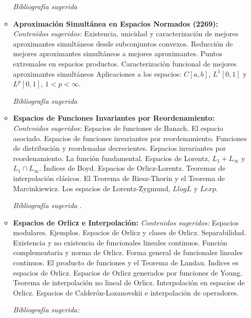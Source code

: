 \documentclass[a4paper, 12pt]{article}
\begin{document}
\begin{enumerate}
\begin{itemize}
\noindent \textit{Bibliografía sugerida}
\cite{cheney66,lorentz2005approximation,pinkus1989l1,iske2018approximation,powell1981approximation,rice1964approximation,singer1970best}



\item\textbf{ Aproximación Simultánea en Espacios Normados (2269):}
\emph{Contenidos sugeridos:} Existencia,  unicidad y caracterización de mejores aproximantes simultáneos desde subconjuntos
convexos.  Reducción  de  mejores aproximantes simultáneos a mejores aproximantes.   Puntos  extremales  en  espacios  productos. Caracterización  funcional de  mejores aproximantes  simultáneos  Aplicaciones  a  los espacios: $C[a,b]$, $L^1[0,1]$ y $L^p[0,1]$, $1 < p <\infty$.

\noindent \textit{Bibliografía sugerida} \cite{alimov,holland,Karakus,Lin,Pinkus,Houtari,Soriano}
 

 
\item\textbf{Espacios de Funciones Invariantes por Reordenamiento:}
\emph{Contenidos sugeridos:}  Espacios de funciones de Banach. El espacio asociado. Espacios de funciones invariantes por reordenamiento. Funciones de distribución y reordenadas decrecientes. Espacios invariantes por reordenamiento. La función fundamental.  Espacios de Lorentz, $L_1+ L_\infty$ y $L_1 \cap L_\infty$. Índices de Boyd. Espacios de Orlicz-Lorentz. Teoremas de interpolación clásicos. El Teorema de Riesz-Thorin y el Teorema de Marcinkiewicz. Los espacios de Lorentz-Zygmund, $LlogL$ y $Lexp$.

\noindent \textit{Bibliografía sugerida}
\cite{bennett1988interpolation,Soria,Lindenstrauss,Krein}.



\item\textbf{Espacios de Orlicz e Interpolación:} 
\emph{Contenidos sugeridos:} Espacios modulares. Ejemplos. Espacios de Orlicz y clases de Orlicz. Separabilidad. Existencia y no existencia de funcionales lineales continuos. Función complementaria y norma de Orlicz. Forma general de funcionales lineales continuos. El producto de funciones y el Teorema de Landau. Indices es espacios de Orlicz. Espacios de Orlicz generados por funciones de Young. Teorema de interpolación no lineal de Orlicz. Interpolación en espacios de Orlicz. Espacios de Calderón-Lozanovskii e interpolación de operadores.

\noindent \textit{Bibliografía sugerida: } \cite{ Harjulehto,Krbec,KR,Lang19,Rao91}



\end{itemize}
\end{enumerate}
\end{document}

